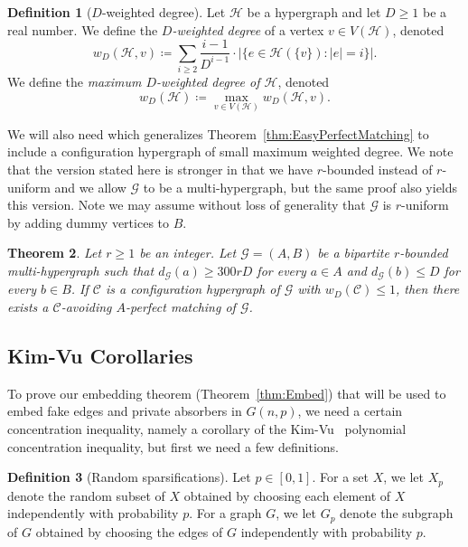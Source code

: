 \documentclass[11pt]{article}
\numberwithin{equation}{section}
\newcounter{i}
\theoremstyle{plain}
\newtheorem{thm}{Theorem}[section]
\theoremstyle{plain} %
\theoremstyle{definition}
\newtheorem{definition}[thm]{Definition}
\newcommand{\cC}{\mathcal{C}}
\newcommand{\cH}{\mathcal{H}}
\newcommand{\cG}{\mathcal{G}}
\begin{document}
\begin{definition}[$D$-weighted degree]
    Let $\cH$ be a hypergraph and let $D \geq 1$ be a real number. We define the \textit{$D$-weighted degree} of a vertex $v \in V(\cH)$, denoted 
    \begin{equation*}
        w_D(\cH, v) \coloneqq \sum_{i\geq 2}\frac{i-1}{D^{i-1}}\cdot |\{e \in \cH(\{v\}) : |e| = i\}|.
    \end{equation*}
We define the \textit{maximum $D$-weighted degree of $\cH$}, denoted
    \begin{equation*}
        w_D(\cH) \coloneqq \max_{v\in V(\cH)}w_D(\cH, v).
    \end{equation*}
\end{definition}
We will also need \cite[Lemma 3.4]{DP22} which generalizes Theorem~\ref{thm:EasyPerfectMatching} to include a configuration hypergraph of small maximum weighted degree.  We note that the version stated here is stronger in that we have $r$-bounded instead of $r$-uniform and we allow $\cG$ to be a multi-hypergraph, but the same proof also yields this version.  Note we may assume without loss of generality that $\cG$ is $r$-uniform by adding dummy vertices to $B$.
\begin{thm}\label{thm:BipartitePerfectMatching}
Let $r \geq 1$ be an integer. Let $\cG=(A,B)$ be a bipartite $r$-bounded multi-hypergraph such that $d_\cG(a) \geq 300rD$ for every $a \in A$ and $d_\cG(b) \leq D$ for every $b \in B$. 
If $\cC$ is a configuration hypergraph of $\cG$ with $w_D(\cC) \leq 1$, then there exists a $\cC$-avoiding $A$-perfect matching of $\cG$.
\end{thm}




\subsection{Kim-Vu Corollaries}

To prove our embedding theorem (Theorem~\ref{thm:Embed}) that will be used to embed fake edges and private absorbers in $G(n,p)$, we need a certain concentration inequality, namely a corollary of the Kim-Vu~\cite{KV00} polynomial concentration inequality, but first we need a few definitions.

\begin{definition}[Random sparsifications] 
Let $p \in [0,1]$.  
For a set $X$, we let $X_p$ denote the random subset of $X$ obtained by choosing each element of $X$ independently with probability $p$.
For a graph $G$, we let $G_p$ denote the subgraph of $G$ obtained by choosing the edges of $G$ independently with probability $p$. 
\end{definition}
\end{document}
